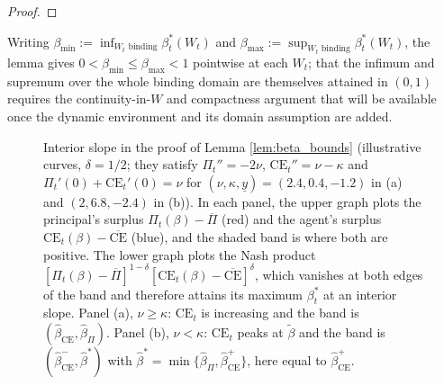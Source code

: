 \documentclass{article}
\theoremstyle{definition}
\theoremstyle{plain}
\begin{document}
\begin{appendices}
\begin{proof}
\end{proof}
Writing $\beta_{\min} := \inf_{W_t \text{ binding}} \beta_t^*(W_t)$ and $\beta_{\max} := \sup_{W_t \text{ binding}} \beta_t^*(W_t)$, the lemma gives $0 < \beta_{\min} \le \beta_{\max} < 1$ pointwise at each $W_t$; that the infimum and supremum over the whole binding domain are themselves attained in $(0,1)$ requires the continuity-in-$W$ and compactness argument that will be available once the dynamic environment and its domain assumption are added.

\begin{figure}[htbp]
\centering
\caption{Interior slope in the proof of Lemma \ref{lem:beta_bounds} (illustrative curves, $\delta=1/2$; they satisfy $\Pi_t''=-2\nu$, $\text{CE}_t''=\nu-\kappa$ and $\Pi_t'(0)+\text{CE}_t'(0)=\nu$ for $(\nu,\kappa,\underline y)=(2.4,0.4,-1.2)$ in (a) and $(2,6.8,-2.4)$ in (b)). In each panel, the upper graph plots the principal's surplus $\Pi_t(\beta)-\overline\Pi$ (red) and the agent's surplus $\text{CE}_t(\beta)-\overline{\text{CE}}$ (blue), and the shaded band is where both are positive. The lower graph plots the Nash product $[\Pi_t(\beta)-\overline\Pi]^{1-\delta}[\text{CE}_t(\beta)-\overline{\text{CE}}]^{\delta}$, which vanishes at both edges of the band and therefore attains its maximum $\beta_t^*$ at an interior slope. Panel (a), $\nu\ge\kappa$: $\text{CE}_t$ is increasing and the band is $(\widehat\beta_{\mathrm{CE}},\widehat\beta_\Pi)$. Panel (b), $\nu<\kappa$: $\text{CE}_t$ peaks at $\tilde\beta$ and the band is $(\widehat\beta_{\mathrm{CE}}^{-},\widehat\beta^{*})$ with $\widehat\beta^{*}=\min\{\widehat\beta_\Pi,\widehat\beta_{\mathrm{CE}}^{+}\}$, here equal to $\widehat\beta_{\mathrm{CE}}^{+}$.}
\medskip


\end{figure}
\end{appendices}
\end{document}
